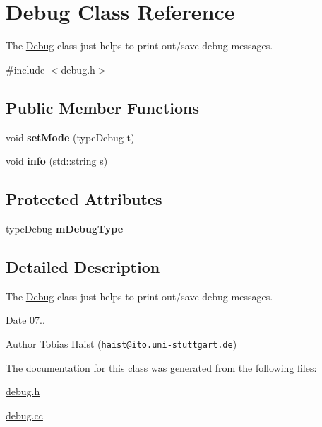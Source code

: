 \hypertarget{classDebug}{}\section{Debug Class Reference}
\label{classDebug}


The \hyperlink{classDebug}{Debug} class just helps to print out/save debug messages.  




{\ttfamily \#include $<$debug.\+h$>$}

\subsection*{Public Member Functions}
\begin{DoxyCompactItemize}
\item 
void {\bfseries set\+Mode} (type\+Debug t)\hypertarget{classDebug_a2883f870dc13c939c2e840a4f3fe2704}{}\label{classDebug_a2883f870dc13c939c2e840a4f3fe2704}

\item 
void {\bfseries info} (std\+::string s)\hypertarget{classDebug_a7ff442c2847f4cb56780d646f4c036e8}{}\label{classDebug_a7ff442c2847f4cb56780d646f4c036e8}

\end{DoxyCompactItemize}
\subsection*{Protected Attributes}
\begin{DoxyCompactItemize}
\item 
type\+Debug {\bfseries m\+Debug\+Type}\hypertarget{classDebug_a9853b3a180c8dd92b459ac9feba5c691}{}\label{classDebug_a9853b3a180c8dd92b459ac9feba5c691}

\end{DoxyCompactItemize}


\subsection{Detailed Description}
The \hyperlink{classDebug}{Debug} class just helps to print out/save debug messages. 

\begin{DoxyDate}{Date}
07.. 
\end{DoxyDate}
\begin{DoxyAuthor}{Author}
Tobias Haist (\href{mailto:haist@ito.uni-stuttgart.de}{\tt haist@ito.\+uni-\/stuttgart.\+de}) 
\end{DoxyAuthor}


The documentation for this class was generated from the following files\+:\begin{DoxyCompactItemize}
\item 
\hyperlink{debug_8h}{debug.\+h}\item 
\hyperlink{debug_8cc}{debug.\+cc}\end{DoxyCompactItemize}
